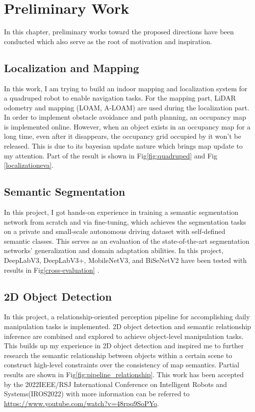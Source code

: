 \chapter{Preliminary Work}
In this chapter, preliminary works toward the proposed directions have been conducted which also serve as the root of motivation and inspiration.

\section{Localization and Mapping}
In this work, I am trying to build an indoor mapping and localization system for a quadruped robot to enable navigation tasks. For the mapping part, LiDAR odometry and mapping (LOAM, A-LOAM\cite{zhang2014loam}) are used during the localization part. In order to implement obstacle avoidance and path planning, an occupancy map is implemented online. However, when an object exists in an occupancy map for a long time, even after it disappears, the occupancy grid occupied by it won't be released. This is due to its bayesian update nature which brings map update to my attention. Part of the result is shown in Fig\ref{fig:quadruped} and Fig \ref{localizationeva}.
\section{Semantic Segmentation}
In this project, I got hands-on experience in training a semantic segmentation network from scratch and via fine-tuning, which achieves the segmentation tasks on a private and small-scale autonomous driving dataset with self-defined semantic classes. This serves as an evaluation of the state-of-the-art segmentation networks' generalization and domain adaptation abilities. In this project, DeepLabV3\cite{chen2017rethinking}, DeepLabV3+\cite{chen2018encoder}, MobileNetV3\cite{howard2019searching}, and BiSeNetV2\cite{yu2021bisenet} have been tested with results in Fig\ref{cross-evaluation} .
\section{2D Object Detection}
In this project, a relationship-oriented perception pipeline for accomplishing daily manipulation tasks is implemented. 2D object detection and semantic relationship inference are combined and explored to achieve object-level manipulation tasks. This builds up my experience in 2D object detection and inspired me to further research the semantic relationship between objects within a certain scene to construct high-level constraints over the consistency of map semantics. Partial results are shown in Fig\ref{fig:pipeline_relationship}. This work has been accepted by the 2022IEEE/RSJ International Conference on Intelligent Robots and Systems(IROS2022) with more information can be referred to \url{https://www.youtube.com/watch?v=48rpq9SoPYo}.
